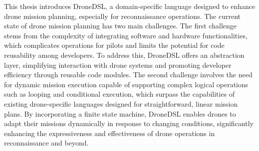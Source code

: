 \abstract
This thesis introduces DroneDSL, a domain-specific language designed to enhance drone mission planning, especially for reconnaissance operations. The current state of drone mission planning has two main challenges. The first challenge stems from the complexity of integrating software and hardware functionalities, which complicates operations for pilots and limits the potential for code reusability among developers. To address this, DroneDSL offers an abstraction layer, simplifying interaction with drone systems and promoting developer efficiency through reusable code modules. The second challenge involves the need for dynamic mission execution capable of supporting complex logical operations such as looping and conditional execution, which surpass the capabilities of existing drone-specific languages designed for straightforward, linear mission plans. By incorporating a finite state machine, DroneDSL enables drones to adapt their missions dynamically in response to changing conditions, significantly enhancing the expressiveness and effectiveness of drone operations in reconnaissance and beyond.